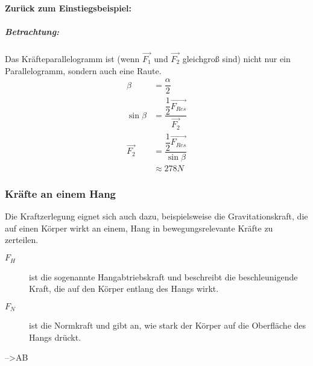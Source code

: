	\paragraph{Zurück zum Einstiegsbeispiel:}
	\subparagraph{Betrachtung:}
	Das Kräfteparallelogramm ist (wenn $ \vec{F_1} $ und $ \vec{F_2} $ gleichgroß sind) nicht nur ein Parallelogramm, sondern auch eine Raute.
	\begin{subequations}
		\begin{align}
			\beta &= \dfrac{\alpha}{2}\\
			\sin\beta &= \dfrac{\dfrac{1}{2}\vec{F_{Res}}}{\vec{F_2}}\\
			\vec{F_2} &= \dfrac{\dfrac{1}{2}\vec{F_{Res}}}{\sin\beta}\\
			& \approx 278N
		\end{align}
	\end{subequations}
	
	\subsubsection{Kräfte an einem Hang}
	Die Kraftzerlegung eignet sich auch dazu, beispielsweise die Gravitationskraft, die auf einen Körper wirkt an einem, Hang in bewegungsrelevante Kräfte zu zerteilen.
	\begin{description}
		\item[$ F_H $] ist die sogenannte Hangabtriebskraft und beschreibt die beschleunigende Kraft, die auf den Körper entlang des Hangs wirkt.
		\item[$ F_N $] ist die Normkraft und gibt an, wie stark der Körper auf die Oberfläche des Hangs drückt.
	\end{description}
	-->AB
